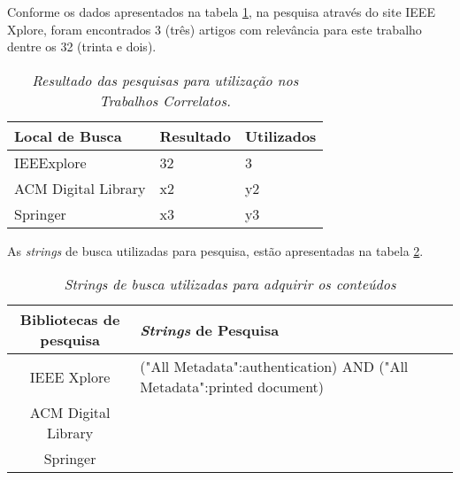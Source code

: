 Conforme os dados apresentados na tabela \ref{tab:resultado-pesquisa},
na pesquisa através do site IEEE Xplore, foram encontrados 3 (três)
artigos com relevância para este trabalho dentre os 32 (trinta e
dois).

\begin{table}[h!]
    \centering
    \begin{tabular}{| m{3cm} | m{3cm} | m{3cm} |}
        \hline
        Local de Busca      & Resultado & Utilizados \\ \hline

        IEEExplore          & 32        & 3          \\ \hline
        ACM Digital Library & x2        & y2         \\ \hline
        Springer            & x3        & y3         \\ \hline
    \end{tabular}
    \caption[Resultado das pesquisas]{\textit{Resultado das
    pesquisas para utilização nos Trabalhos Correlatos.}}
    \label{tab:resultado-pesquisa}
\end{table}

\newpage
As \textit{strings} de busca utilizadas para pesquisa, estão
apresentadas na tabela \ref{tab:strings-busca}.
\begin{table}[h]
    \centering
    \begin{tabular}{|c|m{6cm}|l|l|}
        \hline
        Bibliotecas de pesquisa & \textit{Strings} de Pesquisa \\ \hline

        IEEE Xplore & ("All Metadata":authentication) AND ("All
        Metadata":printed document)
        \\ \hline
        ACM Digital Library &
        \\ \hline
        Springer &
        \\ \hline
    \end{tabular}
    \caption[Strings de busca]{\textit{Strings de busca utilizadas
    para adquirir os conteúdos}}
    \label{tab:strings-busca}
\end{table}